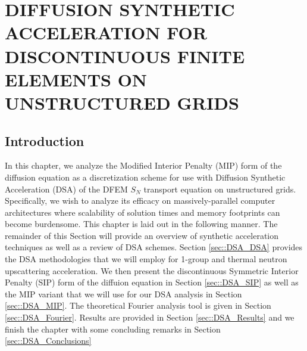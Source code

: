 %
%
%
\chapter{\uppercase {Diffusion Synthetic Acceleration for Discontinuous Finite Elements on Unstructured Grids}}
\label{sec::DSA}

\section{Introduction}
\label{sec::DSA_Introduction}

In this chapter, we analyze the Modified Interior Penalty (MIP) form of the diffusion equation as a discretization scheme for use with Diffusion Synthetic Acceleration (DSA) of the DFEM $S_N$ transport equation on unstructured grids. Specifically, we wish to analyze its efficacy on massively-parallel computer architectures where scalability of solution times and memory footprints can become burdensome. This chapter is laid out in the following manner. The remainder of this Section will provide an overview of synthetic acceleration techniques as well as a review of DSA schemes. Section \ref{sec::DSA_DSA} provides the DSA methodologies that we will employ for 1-group and thermal neutron upscattering acceleration. We then present the discontinuous Symmetric Interior Penalty (SIP) form of the diffuion equation in Section \ref{sec::DSA_SIP} as well as the MIP variant that we will use for our DSA analysis in Section \ref{sec::DSA_MIP}. The theoretical Fourier analysis tool is given in Section \ref{sec::DSA_Fourier}. Results are provided in Section \ref{sec::DSA_Results} and we finish the chapter with some concluding remarks in Section \ref{sec::DSA_Conclusions}

